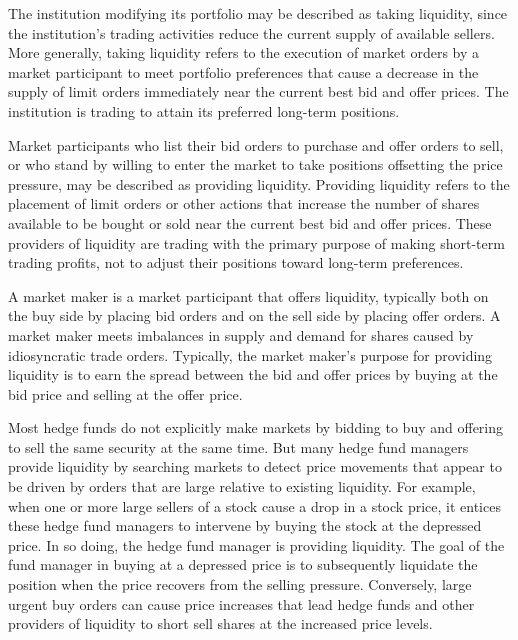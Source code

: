 \documentclass[11pt]{article}
\begin{document}
The institution modifying its portfolio may be described as taking liquidity, since the institution's trading activities reduce the current supply of available sellers. More generally, taking liquidity refers to the execution of market orders by a market participant to meet portfolio preferences that cause a decrease in the supply of limit orders immediately near the current best bid and offer prices. The institution is trading to attain its preferred long-term positions.

Market participants who list their bid orders to purchase and offer orders to sell, or who stand by willing to enter the market to take positions offsetting the price pressure, may be described as providing liquidity. Providing liquidity refers to the placement of limit orders or other actions that increase the number of shares available to be bought or sold near the current best bid and offer prices. These providers of liquidity are trading with the primary purpose of making short-term trading profits, not to adjust their positions toward long-term preferences.

A market maker is a market participant that offers liquidity, typically both on the buy side by placing bid orders and on the sell side by placing offer orders. A market maker meets imbalances in supply and demand for shares caused by idiosyncratic trade orders. Typically, the market maker's purpose for providing liquidity is to earn the spread between the bid and offer prices by buying at the bid price and selling at the offer price.

Most hedge funds do not explicitly make markets by bidding to buy and offering to sell the same security at the same time. But many hedge fund managers provide liquidity by searching markets to detect price movements that appear to be driven by orders that are large relative to existing liquidity. For example, when one or more large sellers of a stock cause a drop in a stock price, it entices these hedge fund managers to intervene by buying the stock at the depressed price. In so doing, the hedge fund manager is providing liquidity. The goal of the fund manager in buying at a depressed price is to subsequently liquidate the position when the price recovers from the selling pressure. Conversely, large urgent buy orders can cause price increases that lead hedge funds and other providers of liquidity to short sell shares at the increased price levels.
\end{document}
